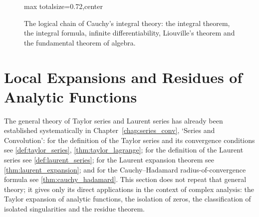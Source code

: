 \begin{figure}[htbp]
\centering
\begin{adjustbox}{max totalsize={\linewidth}{0.72\textheight},center}
\end{adjustbox}
\caption{The logical chain of Cauchy's integral theory: the integral theorem, the integral formula, infinite differentiability, Liouville's theorem and the fundamental theorem of algebra.}
\label{fig:cauchy_theory_flow}
\end{figure}

\section{Local Expansions and Residues of Analytic Functions}\label{sec:analytic_expansion_residue}

\begin{remark}\label{rem:expansion_series_interface}
The general theory of Taylor series and Laurent series has already been established systematically in Chapter~\ref{chap:series_conv}, `Series and Convolution': for the definition of the Taylor series and its convergence conditions see \cref{def:taylor_series}, \cref{thm:taylor_lagrange}; for the definition of the Laurent series see \cref{def:laurent_series}; for the Laurent expansion theorem see \cref{thm:laurent_expansion}; and for the Cauchy--Hadamard radius-of-convergence formula see \cref{thm:cauchy_hadamard}. This section does not repeat that general theory; it gives only its direct applications in the context of complex analysis: the Taylor expansion of analytic functions, the isolation of zeros, the classification of isolated singularities and the residue theorem.
\end{remark}

